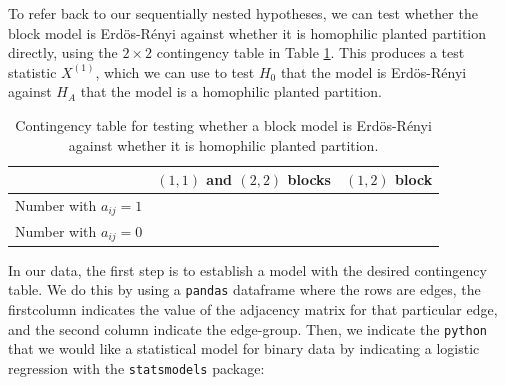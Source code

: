 To refer back to our sequentially nested hypotheses, we can test whether the block model is Erd\"os-R\'enyi against whether it is homophilic planted partition directly, using the $2 \times 2$ contingency table in Table \ref{tab:ch7:model:cont_homo}. This produces a test statistic $X^{(1)}$, which we can use to test $H_0$ that the model is Erd\"os-R\'enyi against $H_A$ that the model is a homophilic planted partition. 

\begin{table}[h]
    \centering
    \begin{tabular}{c|c|c}
         & $(1, 1)$ and $(2, 2)$ blocks & $(1, 2)$ block \\
         \hline
         Number with $a_{ij} = 1$ & & \\
         Number with $a_{ij} = 0$ & & 
    \end{tabular}
    \caption{Contingency table for testing whether a block model is Erd\"os-R\'enyi against whether it is homophilic planted partition.}
    \label{tab:ch7:model:cont_homo}
\end{table}

In our data, the first step is to establish a model with the desired contingency table. We do this by using a \texttt{pandas} dataframe where the rows are edges, the firstcolumn indicates the value of the adjacency matrix for that particular edge, and the second column indicate the edge-group. Then, we indicate the \texttt{python} that we would like a statistical model for binary data by indicating a logistic regression with the \texttt{statsmodels} package:

